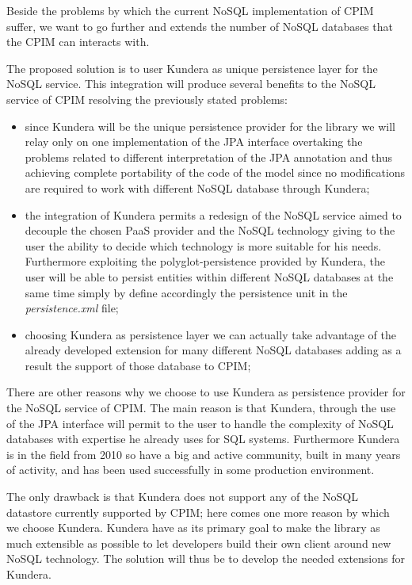 \newparagraph Beside the problems by which the current NoSQL implementation of CPIM suffer, we want to go further and extends the number of NoSQL databases that the CPIM can interacts with.

\noindent The proposed solution is to user Kundera as unique persistence layer for the NoSQL service. This integration will produce several benefits to the NoSQL service of CPIM resolving the previously stated problems:
\begin{itemize}
\item since Kundera will be the unique persistence provider for the library we will relay only on one implementation of the JPA interface overtaking the problems related to different interpretation of the JPA annotation and thus achieving complete portability of the code of the model since no modifications are required to work with different NoSQL database through Kundera;
\item the integration of Kundera permits a redesign of the NoSQL service aimed to decouple the chosen PaaS provider and the NoSQL technology giving to the user the ability to decide which technology is more suitable for his needs. Furthermore exploiting the polyglot-persistence provided by Kundera, the user will be able to persist entities within different NoSQL databases at the same time simply by define accordingly the persistence unit in the \textit{persistence.xml} file;
\item choosing Kundera as persistence layer we can actually take advantage of the already developed extension for many different NoSQL databases adding as a result the support of those database to CPIM;
\end{itemize}

\noindent There are other reasons why we choose to use Kundera as persistence provider for the NoSQL service of CPIM. The main reason is that Kundera, through the use of the JPA interface will permit to the user to handle the complexity of NoSQL databases with expertise he already uses for SQL systems.
Furthermore Kundera is in the field from 2010 so have a big and active community, built in many years of activity, and has been used successfully in some production environment.

\noindent The only drawback is that Kundera does not support any of the NoSQL datastore currently supported by CPIM; here comes one more reason by which we choose Kundera. Kundera have as its primary goal to make the library as much extensible as possible to let developers build their own client around new NoSQL technology. The solution will thus be to develop the needed extensions for Kundera.

